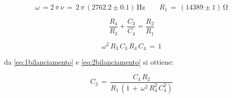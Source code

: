 \begin{equation*}
\omega \, = 2 \, \pi \, \nu \, = \, 2 \, \pi \, (2762.2 \pm 0.1) \, \si{\hertz}
\qquad R_1 \, = \, (14389 \pm 1) \, \si{\ohm}
\end{equation*}

\begin{equation}
\frac{R_4}{R_3} + \frac{C_3}{C_4} = \frac{R_2}{R_1}
\label{eq:1bilanciamento}
\end{equation}

\begin{equation}
\omega^2 \, R_3 \, C_3 \, R_4 \, C_4 \, = \, 1
\label{eq:2bilanciamento}
\end{equation}

da \ref{eq:1bilanciamento} e \ref{eq:2bilanciamento} si ottiene:

\begin{equation}
C_3 \, = \, \frac{C_4 \, R_2}{R_1 \, (1 \, + \, \omega^2 \, R_4^2 \, C_4^2)}
\end{equation}
